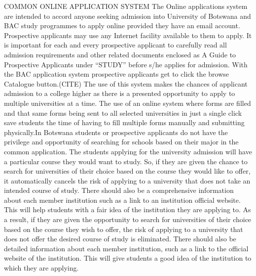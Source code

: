 COMMON ONLINE APPLICATION SYSTEM
The Online applications system are intended to accord anyone seeking admission into University of Botswana and BAC study programmes to apply online provided they have an email account. Prospective applicants may use any Internet facility available to them to apply. It is important for each and every prospective applicant to carefully read all admission requirements and other related documents enclosed as A Guide to Prospective Applicants under “STUDY” before s/he applies for admission. With the BAC application system prospective applicants get to click the browse Catalogue button.(CITE)
The use of this system makes the chances of applicant admission to a college higher as there is a presented opportunity to apply to multiple universities at a time. The use of an online system where forms are filled and that same forms being sent to all selected universities in just a single click save students the time of having to fill multiple forms manually and submitting physically.In Botswana students or prospective applicants do not have the privilege and opportunity of searching for schools based on their major in the common application. The students applying for the university admission will have a particular course they would want to study. So, if they are given the chance to search for universities of their choice based on the course they would like to offer, it automatically cancels the risk of applying to a university that does not take an intended course of study. There should also be a comprehensive information about each member institution such as a link to an institution official website. This will help students with a fair idea of the institution they are applying to.
As a result, if they are given the opportunity to search for universities of their choice based on the course they wish to offer, the risk of applying to a university that does not offer the desired course of study is eliminated. There should also be detailed information about each member institution, such as a link to the official website of the institution. This will give students a good idea of the institution to which they are applying.

